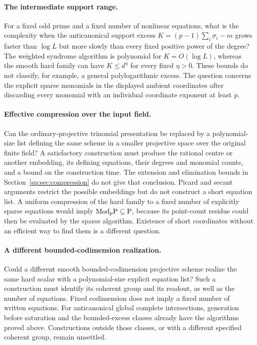 \paragraph{The intermediate support range.}
For a fixed odd prime and a fixed number of nonlinear equations, what is
the complexity when the anticanonical support excess
\(K=(p-1)\sum_i\sigma_i-m\) grows faster than \(\log L\) but more
slowly than every fixed positive power of the degree? The weighted
syndrome algorithm is polynomial for \(K=O(\log L)\), whereas the
smooth hard family can have \(K\leq d^\eta\) for every fixed
\(\eta>0\). These bounds do not classify, for example, a general
polylogarithmic excess. The question concerns the explicit sparse
monomials in the displayed ambient coordinates after discarding every
monomial with an individual coordinate exponent at least \(p\).

\paragraph{Effective compression over the input field.}
Can the ordinary-projective trinomial presentation be replaced by a
polynomial-size list defining the same scheme in a smaller projective
space over the original finite field? A satisfactory construction must
produce the rational centre or another embedding, its defining equations,
their degrees and monomial counts, and a bound on the construction time.
The extension and elimination bounds in Section~\ref{sp:sec:compression}
do not give that conclusion. Picard and secant arguments restrict the
possible embeddings but do not construct a short equation list. A
uniform compression of the hard family to a fixed number of explicitly
sparse equations would imply \(\mathrm{Mod}_p\mathrm P\subseteq\mathrm P\), because
its point-count residue could then be evaluated by the sparse algorithm.
Existence of short coordinates without an efficient way to find them is
a different question.

\paragraph{A different bounded-codimension realization.}
Could a different smooth bounded-codimension projective scheme realize
the same hard scalar with a polynomial-size explicit equation list?
Such a construction must identify its coherent group and its readout,
as well as the number of equations. Fixed codimension does not imply a
fixed number of written equations. For anticanonical global complete
intersections, generation before saturation and the bounded-excess
classes already have the algorithms proved above. Constructions outside
those classes, or with a different specified coherent group, remain
unsettled.

